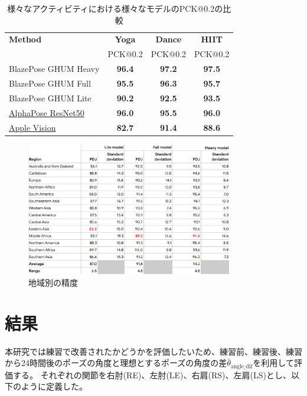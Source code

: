 \begin{table}[ht]
  \centering
  \begin{tabular}{|l|c|c|c|}
  \hline
  \textbf{Method} & \textbf{Yoga} & \textbf{Dance} & \textbf{HIIT} \\
                  & PCK@0.2       & PCK@0.2        & PCK@0.2       \\ 
  \hline
  BlazePose GHUM Heavy                                                      & \textbf{96.4} & \textbf{97.2} & \textbf{97.5} \\
  BlazePose GHUM Full                                                       & \textbf{95.5} & \textbf{96.3} & \textbf{95.7} \\
  BlazePose GHUM Lite                                                       & \textbf{90.2} & \textbf{92.5} & \textbf{93.5} \\
  \href{https://github.com/MVIG-SJTU/AlphaPose}{AlphaPose ResNet50}         & \textbf{96.0} & \textbf{95.5} & \textbf{96.0} \\
  \href{https://developer.apple.com/documentation/vision/detecting_human_body_poses_in_images}{Apple Vision} & \textbf{82.7} & \textbf{91.4} & \textbf{88.6} \\
  \hline
  \end{tabular}
  \caption{様々なアクティビティにおける様々なモデルのPCK@0.2の比較 \cite{pose-estimation-quality}}
  \label{tab:pose-estimation-quality}
\end{table}
  
\begin{figure}[H]
  \begin{center}
  \includegraphics[width=9cm]{figures/Model_Accuracy_by_Race.png}
  \caption{地域別の精度 \cite{Model-Accuracy-by-Race}}
  \label{fig:Model-Accuracy-by-Race}
  \end{center}
\end{figure}

\section{結果}
本研究では練習で改善されたかどうかを評価したいため、練習前、練習後、練習から24時間後のポーズの角度と理想とするポーズの角度の差\(\bar{\theta}_{\text{angle\_dif}}\)を利用して評価する。
それぞれの関節を右肘(RE)、左肘(LE)、右肩(RS)、左肩(LS)とし、以下のように定義した。

